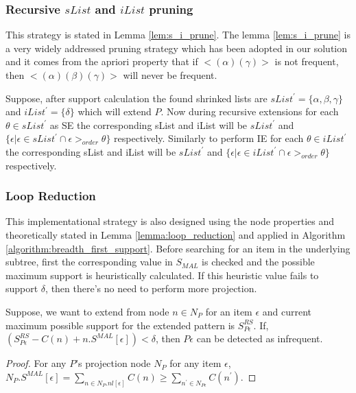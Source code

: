 \subsubsection{Recursive $sList$ and $iList$ pruning}
This strategy is stated in Lemma \ref{lem:s_i_prune}. The lemma \ref{lem:s_i_prune} is a very widely addressed pruning strategy which has been adopted in our solution and it comes from the apriori property that if $< (\alpha)(\gamma) >$ is not frequent, then $< (\alpha)(\beta)(\gamma) >$ will never be frequent. 

\begin{lem} \label{lem:s_i_prune}
Suppose, after support calculation the found shrinked lists are $sList^{\prime}=\{\alpha,\beta,\gamma\}$ and $iList^{\prime}=\{ \delta \}$ which will extend $P$. Now during recursive extensions for each $\theta \in sList^{\prime}$ as SE the corresponding sList and iList will be $sList^{\prime}$ and $\{\epsilon \vert \epsilon \in sList^{\prime} \cap \epsilon >_{order} \theta\}$ respectively. Similarly to perform IE for each $\theta \in iList^{\prime}$ the corresponding sList and iList will be $sList^{\prime}$ and $\{\epsilon \vert \epsilon \in iList^{\prime} \cap \epsilon >_{order} \theta\}$ respectively.
\end{lem}

\subsubsection{Loop Reduction}
This implementational strategy is also designed using the node properties and theoretically stated in Lemma \ref{lemma:loop_reduction} and applied in Algorithm \ref{algorithm:breadth_first_support}. Before searching for an item in the underlying subtree, first the corresponding value in $S_{MAL}$ is checked and the possible maximum support is heuristically calculated. If this heuristic value fails to support $\delta$, then there's no need to perform more projection. 

\begin{lem} \label{lemma:loop_reduction}
Suppose, we want to extend from node $n \in N_{P}$ for an item $\epsilon$ and current maximum possible support for the extended pattern is $S_{P\epsilon}^{RS}$. If, $(S_{P\epsilon}^{RS}-C(n)+n.S^{MAL}[\epsilon]) < \delta$, then $P\epsilon$ can be detected as infrequent.
\end{lem}
\begin{proof}
    For any $P$'s projection node $N_{P}$ for any item $\epsilon$, $N_{P}.S^{MAL}[\epsilon] = \sum_{n \in N_{P}.nl[\epsilon]}C(n) \geq \sum_{n^{\prime} \in N_{P\epsilon}} C(n^{\prime})$.
\end{proof}






